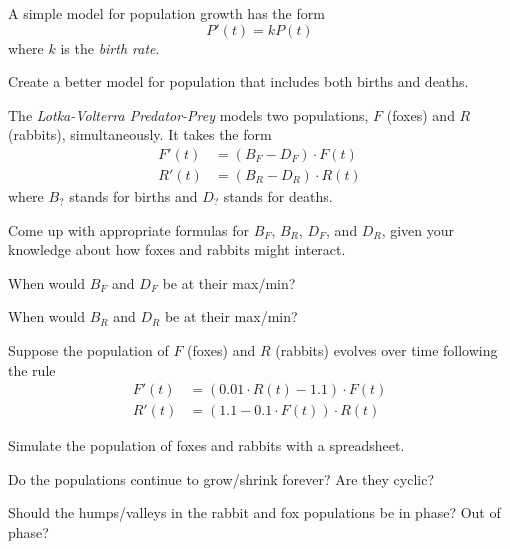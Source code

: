 \documentclass{workbook}
\begin{document}
%
%


\begin{slide}
	\question
	A simple model for population growth has the form
	\[
		P'(t) = kP(t)
	\]
	where $k$ is the \emph{birth rate}.

	\begin{parts}
		\item Create a better model for population that includes both births and deaths.
	\end{parts}
\end{slide}

\begin{slide}
	\question
	The \emph{Lotka-Volterra Predator-Prey} models two populations, $F$ (foxes) and $R$ (rabbits), simultaneously. It takes the form
	\begin{align*}
		F'(t) &= (B_F - D_F)\cdot F(t)\\
		R'(t) &= (B_R - D_R)\cdot R(t)
	\end{align*}
	where $B_{?}$ stands for births and $D_{?}$ stands for deaths.

	\begin{parts}
		\item Come up with appropriate formulas for $B_F$, $B_R$, $D_F$, and $D_R$, given your knowledge about
		how foxes and rabbits might interact.
		\item When would $B_F$ and $D_F$ be at their max/min?
		\item When would $B_R$ and $D_R$ be at their max/min?
	\end{parts}
\end{slide}

\begin{slide}
	\question
	Suppose the population of $F$ (foxes) and $R$ (rabbits) evolves over time following the rule
	\begin{align*}
		F'(t) &= (0.01\cdot R(t) - 1.1)\cdot F(t)\\
		R'(t) &= (1.1 - 0.1\cdot F(t))\cdot R(t)
	\end{align*}

	\begin{parts}
		\item Simulate the population of foxes and rabbits with a spreadsheet.
		\item Do the populations continue to grow/shrink forever? Are they cyclic?
		\item Should the humps/valleys in the rabbit and fox populations be in phase? Out of phase?
	\end{parts}
\end{slide}
\end{document}

